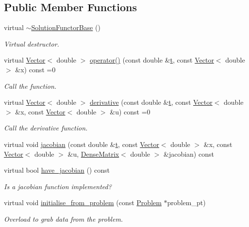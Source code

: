 \subsection*{Public Member Functions}
\begin{DoxyCompactItemize}
\item 
virtual \hyperlink{classoomph_1_1SolutionFunctorBase_a6c5ad348f7c2fa03ae7e9eaa845c6481}{$\sim$\+Solution\+Functor\+Base} ()
\begin{DoxyCompactList}\small\item\em Virtual destructor. \end{DoxyCompactList}\item 
virtual \hyperlink{classoomph_1_1Vector}{Vector}$<$ double $>$ \hyperlink{classoomph_1_1SolutionFunctorBase_ad7177a415b2ef72f89b69dc68028166d}{operator()} (const double \&\hyperlink{cfortran_8h_af6f0bd3dc13317f895c91323c25c2b8f}{t}, const \hyperlink{classoomph_1_1Vector}{Vector}$<$ double $>$ \&x) const =0
\begin{DoxyCompactList}\small\item\em Call the function. \end{DoxyCompactList}\item 
virtual \hyperlink{classoomph_1_1Vector}{Vector}$<$ double $>$ \hyperlink{classoomph_1_1SolutionFunctorBase_aac070b0759ba6f040020972706ed4a9b}{derivative} (const double \&\hyperlink{cfortran_8h_af6f0bd3dc13317f895c91323c25c2b8f}{t}, const \hyperlink{classoomph_1_1Vector}{Vector}$<$ double $>$ \&x, const \hyperlink{classoomph_1_1Vector}{Vector}$<$ double $>$ \&u) const =0
\begin{DoxyCompactList}\small\item\em Call the derivative function. \end{DoxyCompactList}\item 
virtual void \hyperlink{classoomph_1_1SolutionFunctorBase_a53482fed2379500a8f279498aed07d56}{jacobian} (const double \&\hyperlink{cfortran_8h_af6f0bd3dc13317f895c91323c25c2b8f}{t}, const \hyperlink{classoomph_1_1Vector}{Vector}$<$ double $>$ \&x, const \hyperlink{classoomph_1_1Vector}{Vector}$<$ double $>$ \&u, \hyperlink{classoomph_1_1DenseMatrix}{Dense\+Matrix}$<$ double $>$ \&jacobian) const
\item 
virtual bool \hyperlink{classoomph_1_1SolutionFunctorBase_af94ed993230c9b799ce6367b436e7e9e}{have\+\_\+jacobian} () const
\begin{DoxyCompactList}\small\item\em Is a jacobian function implemented? \end{DoxyCompactList}\item 
virtual void \hyperlink{classoomph_1_1SolutionFunctorBase_a016f7f144cc563df9efb7d4679b18c46}{initialise\+\_\+from\+\_\+problem} (const \hyperlink{classoomph_1_1Problem}{Problem} $\ast$problem\+\_\+pt)
\begin{DoxyCompactList}\small\item\em Overload to grab data from the problem. \end{DoxyCompactList}\end{DoxyCompactItemize}



